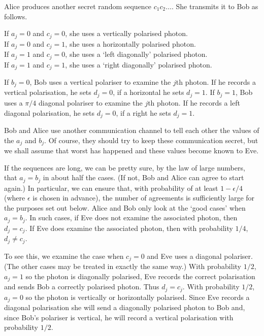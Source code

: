 \documentclass[12pt,a4paper]{article}
\theoremstyle{plain}
\theoremstyle{definition}
\begin{document}
 Alice produces another
secret
random sequence $c_{1}c_{2}\dots$.
She transmits it to Bob as follows.
\begin{center}
If $a_{j}=0$ and $c_{j}=0$, she uses a vertically polarised photon.\\
If $a_{j}=0$ and $c_{j}=1$, she uses a horizontally polarised photon.\\
If $a_{j}=1$ and $c_{j}=0$, she uses a `left diagonally' polarised photon.\\
If $a_{j}=1$ and $c_{j}=1$, she uses a `right diagonally' polarised photon.
\end{center}

 If $b_{j}=0$, Bob uses a vertical polariser
to examine the $j$th photon. If he records a vertical polarisation,
he sets  $d_{j}=0$, if a horizontal he sets $d_{j}=1$.
If $b_{j}=1$, Bob uses a $\pi/4$ diagonal  polariser
to examine the $j$th photon. If he records a left diagonal polarisation,
he sets  $d_{j}=0$, if a right he sets $d_{j}=1$.

 Bob and Alice use another communication
channel to tell each other the values of the $a_{j}$ and
$b_{j}$. Of course, they should try to keep these communication
secret, but we shall assume that worst has happened and
these values become known to Eve.

 If the sequences are long, we can be pretty sure,
by the law of large numbers, that $a_{j}=b_{j}$ in about half the cases.
(If not, Bob and Alice can agree to start again.)  
In particular,  we can ensure that, with probability of at least 
$1-\epsilon/4$ (where $\epsilon$ is chosen in advance), 
the number of agreements is sufficiently
large for the purposes set out below.
Alice
and Bob only look at the `good cases' when $a_{j}=b_{j}$.
In such cases, if Eve does not examine the associated photon,
then $d_{j}=c_{j}$. If Eve does examine the associated photon,
then with probability $1/4$, $d_{j}\neq c_{j}$.

To see this, we examine the case when $c_{j}=0$ and
Eve uses a diagonal polariser. (The other cases
may be treated in exactly the same way.)
With probability $1/2$, $a_{j}=1$ so the photon is diagonally
polarised, Eve records the correct polarisation
and sends Bob a correctly polarised photon. Thus $d_{j}=c_{j}$.
With probability $1/2$, $a_{j}=0$ so the photon is vertically
or horizontally polarised. Since Eve records a diagonal polarisation
she will send a diagonally polarised photon to Bob  
and, since Bob's polariser is vertical, he will
record a vertical polarisation
with probability $1/2$.  
  
\end{document}
